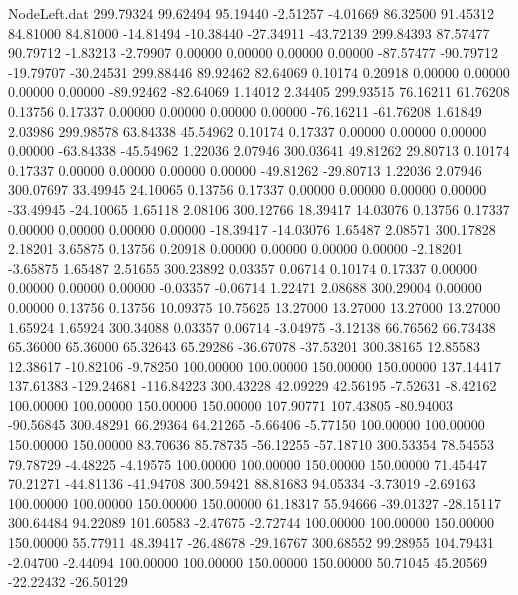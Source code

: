 \begin{filecontents}{NodeLeft.dat}
 299.79324   99.62494   95.19440    -2.51257   -4.01669   86.32500   91.45312   84.81000   84.81000  -14.81494  -10.38440  -27.34911  -43.72139
 299.84393   87.57477   90.79712    -1.83213   -2.79907    0.00000    0.00000    0.00000    0.00000  -87.57477  -90.79712  -19.79707  -30.24531
 299.88446   89.92462   82.64069     0.10174    0.20918    0.00000    0.00000    0.00000    0.00000  -89.92462  -82.64069    1.14012    2.34405
 299.93515   76.16211   61.76208     0.13756    0.17337    0.00000    0.00000    0.00000    0.00000  -76.16211  -61.76208    1.61849    2.03986
 299.98578   63.84338   45.54962     0.10174    0.17337    0.00000    0.00000    0.00000    0.00000  -63.84338  -45.54962    1.22036    2.07946
 300.03641   49.81262   29.80713     0.10174    0.17337    0.00000    0.00000    0.00000    0.00000  -49.81262  -29.80713    1.22036    2.07946
 300.07697   33.49945   24.10065     0.13756    0.17337    0.00000    0.00000    0.00000    0.00000  -33.49945  -24.10065    1.65118    2.08106
 300.12766   18.39417   14.03076     0.13756    0.17337    0.00000    0.00000    0.00000    0.00000  -18.39417  -14.03076    1.65487    2.08571
 300.17828    2.18201    3.65875     0.13756    0.20918    0.00000    0.00000    0.00000    0.00000   -2.18201   -3.65875    1.65487    2.51655
 300.23892    0.03357    0.06714     0.10174    0.17337    0.00000    0.00000    0.00000    0.00000   -0.03357   -0.06714    1.22471    2.08688
 300.29004    0.00000    0.00000     0.13756    0.13756   10.09375   10.75625   13.27000   13.27000   13.27000   13.27000    1.65924    1.65924
 300.34088    0.03357    0.06714    -3.04975   -3.12138   66.76562   66.73438   65.36000   65.36000   65.32643   65.29286  -36.67078  -37.53201
 300.38165   12.85583   12.38617   -10.82106   -9.78250  100.00000  100.00000  150.00000  150.00000  137.14417  137.61383 -129.24681 -116.84223
 300.43228   42.09229   42.56195    -7.52631   -8.42162  100.00000  100.00000  150.00000  150.00000  107.90771  107.43805  -80.94003  -90.56845
 300.48291   66.29364   64.21265    -5.66406   -5.77150  100.00000  100.00000  150.00000  150.00000   83.70636   85.78735  -56.12255  -57.18710
 300.53354   78.54553   79.78729    -4.48225   -4.19575  100.00000  100.00000  150.00000  150.00000   71.45447   70.21271  -44.81136  -41.94708
 300.59421   88.81683   94.05334    -3.73019   -2.69163  100.00000  100.00000  150.00000  150.00000   61.18317   55.94666  -39.01327  -28.15117
 300.64484   94.22089  101.60583    -2.47675   -2.72744  100.00000  100.00000  150.00000  150.00000   55.77911   48.39417  -26.48678  -29.16767
 300.68552   99.28955  104.79431    -2.04700   -2.44094  100.00000  100.00000  150.00000  150.00000   50.71045   45.20569  -22.22432  -26.50129

\end{filecontents}
